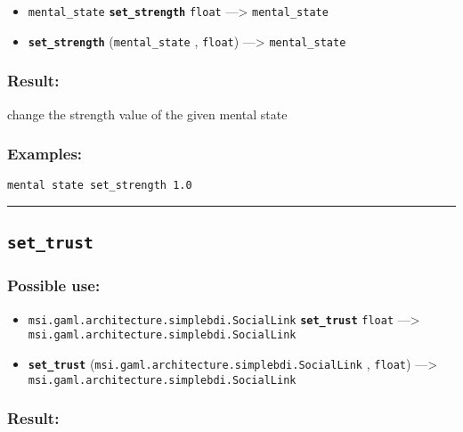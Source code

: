 \documentclass[]{book}
\providecommand{\tightlist}{%
  \setlength{\itemsep}{0pt}\setlength{\parskip}{0pt}}
\theoremstyle{definition}
\theoremstyle{definition}
\theoremstyle{definition}
\theoremstyle{remark}
\begin{document}
\begin{itemize}
\tightlist
\item
  \texttt{mental\_state} \textbf{\texttt{set\_strength}} \texttt{float}
  ---\textgreater{} \texttt{mental\_state}
\item
  \textbf{\texttt{set\_strength}} (\texttt{mental\_state} ,
  \texttt{float}) ---\textgreater{} \texttt{mental\_state}
\end{itemize}

\subsubsection{Result:}\label{result-450}

change the strength value of the given mental state

\subsubsection{Examples:}\label{examples-323}

\begin{verbatim}
mental state set_strength 1.0 
\end{verbatim}

\begin{center}\rule{0.5\linewidth}{\linethickness}\end{center}

\subsection{\texorpdfstring{\texttt{set\_trust}}{set\_trust}}\label{set_trust}

\subsubsection{Possible use:}\label{possible-use-467}

\begin{itemize}
\tightlist
\item
  \texttt{msi.gaml.architecture.simplebdi.SocialLink}
  \textbf{\texttt{set\_trust}} \texttt{float} ---\textgreater{}
  \texttt{msi.gaml.architecture.simplebdi.SocialLink}
\item
  \textbf{\texttt{set\_trust}}
  (\texttt{msi.gaml.architecture.simplebdi.SocialLink} , \texttt{float})
  ---\textgreater{} \texttt{msi.gaml.architecture.simplebdi.SocialLink}
\end{itemize}

\subsubsection{Result:}\label{result-451}
\end{document}

